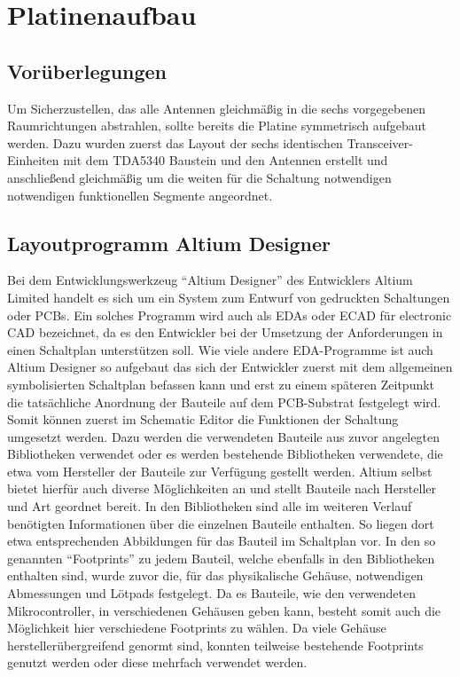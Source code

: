 \chapter{Platinenaufbau}
\label{sec:Platinenaufbau}
\pagestyle{scrheadings}

\section{Vorüberlegungen}
Um Sicherzustellen, das alle Antennen gleichmäßig in die sechs vorgegebenen Raumrichtungen abstrahlen, sollte bereits die Platine symmetrisch aufgebaut werden. Dazu wurden zuerst das Layout der sechs identischen Transceiver-Einheiten mit dem TDA5340 Baustein und den Antennen erstellt und anschließend gleichmäßig um die weiten für die Schaltung notwendigen notwendigen funktionellen Segmente angeordnet. 
\section{Layoutprogramm Altium Designer}
Bei dem Entwicklungswerkzeug \enquote{Altium Designer} des Entwicklers Altium Limited handelt es sich um ein System zum Entwurf von  gedruckten  Schaltungen oder \acp{PCB}. Ein solches Programm wird auch als \acp{EDA} oder ECAD für electronic CAD bezeichnet, da es den Entwickler bei der Umsetzung der Anforderungen in einen Schaltplan unterstützen soll.
Wie viele andere \ac{EDA}-Programme ist auch Altium Designer so aufgebaut das sich der Entwickler zuerst mit dem allgemeinen symbolisierten Schaltplan befassen kann und erst zu einem späteren Zeitpunkt die tatsächliche Anordnung der Bauteile auf dem \ac{PCB}-Substrat festgelegt wird. Somit können zuerst im Schematic Editor die Funktionen der Schaltung umgesetzt werden. Dazu werden die verwendeten Bauteile aus zuvor angelegten Bibliotheken verwendet oder es werden bestehende Bibliotheken verwendete, die etwa vom Hersteller der Bauteile zur Verfügung gestellt werden. Altium selbst bietet hierfür auch diverse Möglichkeiten an und stellt Bauteile nach Hersteller und Art geordnet bereit.
In den Bibliotheken sind alle im weiteren Verlauf benötigten Informationen über die einzelnen Bauteile enthalten. So liegen dort etwa  entsprechenden Abbildungen für das Bauteil im  Schaltplan  vor. In den so genannten \enquote{Footprints} zu jedem Bauteil, welche ebenfalls in den Bibliotheken enthalten sind, wurde zuvor die, für das physikalische Gehäuse, notwendigen Abmessungen und Lötpads festgelegt. Da es Bauteile, wie den verwendeten  Mikrocontroller, in verschiedenen Gehäusen geben kann, besteht somit auch die Möglichkeit hier verschiedene Footprints zu wählen. Da viele Gehäuse herstellerübergreifend genormt sind, konnten teilweise bestehende Footprints genutzt werden oder diese mehrfach verwendet werden.

